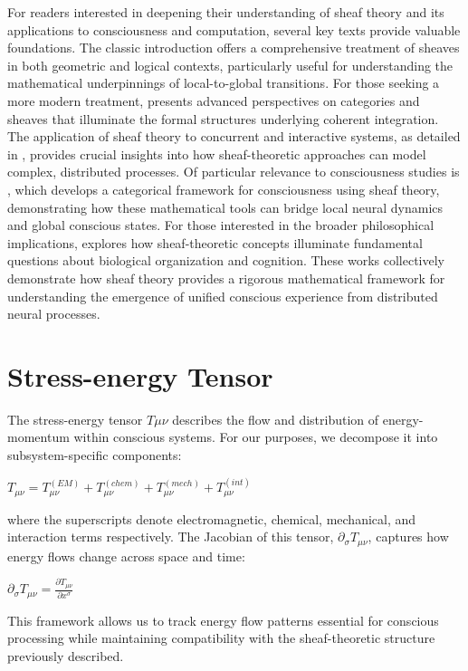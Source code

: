 \begin{refsection}
For readers interested in deepening their understanding of sheaf theory and its applications to consciousness and computation, several key texts provide valuable foundations. The classic introduction \cite{MacLane1992} offers a comprehensive treatment of sheaves in both geometric and logical contexts, particularly useful for understanding the mathematical underpinnings of local-to-global transitions. For those seeking a more modern treatment, \cite{Kashiwara2005} presents advanced perspectives on categories and sheaves that illuminate the formal structures underlying coherent integration. The application of sheaf theory to concurrent and interactive systems, as detailed in \cite{Goguen1992}, provides crucial insights into how sheaf-theoretic approaches can model complex, distributed processes. Of particular relevance to consciousness studies is \cite{Rushworth2018}, which develops a categorical framework for consciousness using sheaf theory, demonstrating how these mathematical tools can bridge local neural dynamics and global conscious states. For those interested in the broader philosophical implications, \cite{Rosen1991} explores how sheaf-theoretic concepts illuminate fundamental questions about biological organization and cognition. These works collectively demonstrate how sheaf theory provides a rigorous mathematical framework for understanding the emergence of unified conscious experience from distributed neural processes.

\section{Stress-energy Tensor}

The stress-energy tensor $T\mu\nu$ describes the flow and distribution of energy-momentum within conscious systems. For our purposes, we decompose it into subsystem-specific components:

$T_{\mu\nu} = T_{\mu\nu}^{(EM)} + T_{\mu\nu}^{(chem)} + T_{\mu\nu}^{(mech)} + T_{\mu\nu}^{(int)}$

where the superscripts denote electromagnetic, chemical, mechanical, and interaction terms respectively. The Jacobian of this tensor, $\partial_\sigma T_{\mu\nu}$, captures how energy flows change across space and time:

$\partial_\sigma T_{\mu\nu} = \frac{\partial T_{\mu\nu}}{\partial x^\sigma}$

This framework allows us to track energy flow patterns essential for conscious processing while maintaining compatibility with the sheaf-theoretic structure previously described.


\end{refsection}
